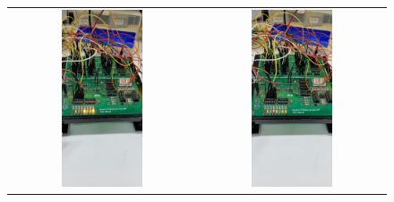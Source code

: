 \documentclass[a4,12pt]{horizon-theme}
\begin{document}
\begin{figure}[!ht]
  \centering
  \begin{tabular}{cc}
    \includegraphics[width=0.45\textwidth, trim={0 20cm 0 7cm}, clip]{circ_1.jpg} & \includegraphics[width=0.45\textwidth, trim={0 20cm 0 7cm}, clip]{circ_2.jpg} \\

\end{tabular}
\end{figure}
\end{document}
